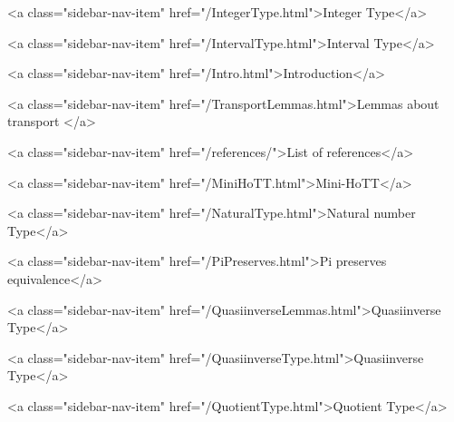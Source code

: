       
    
      
        
          <a class="sidebar-nav-item" href="/IntegerType.html">Integer Type</a>
        
      
    
      
        
          <a class="sidebar-nav-item" href="/IntervalType.html">Interval Type</a>
        
      
    
      
        
          <a class="sidebar-nav-item" href="/Intro.html">Introduction</a>
        
      
    
      
        
          <a class="sidebar-nav-item" href="/TransportLemmas.html">Lemmas about transport </a>
        
      
    
      
        
          <a class="sidebar-nav-item" href="/references/">List of references</a>
        
      
    
      
        
          <a class="sidebar-nav-item" href="/MiniHoTT.html">Mini-HoTT</a>
        
      
    
      
        
          <a class="sidebar-nav-item" href="/NaturalType.html">Natural number Type</a>
        
      
    
      
        
          <a class="sidebar-nav-item" href="/PiPreserves.html">Pi preserves equivalence</a>
        
      
    
      
        
          <a class="sidebar-nav-item" href="/QuasiinverseLemmas.html">Quasiinverse Type</a>
        
      
    
      
        
          <a class="sidebar-nav-item" href="/QuasiinverseType.html">Quasiinverse Type</a>
        
      
    
      
        
          <a class="sidebar-nav-item" href="/QuotientType.html">Quotient Type</a>
        
